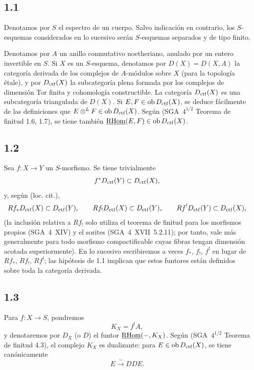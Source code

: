 \subsection*{1.1}
Denotamos por $S$ el espectro de un cuerpo. Salvo indicación en contrario, los $S$-esquemas considerados en lo sucesivo serán $S$-esquemas separados y de tipo finito.

Denotamos por $A$ un anillo conmutativo noetheriano, anulado por un entero invertible en $S$. Si $X$ es un $S$-esquema, denotamos por $D(X)=D(X,A)$ la categoría derivada de los complejos de $A$-módulos sobre $X$ (para la topología étale), y por $D_{\mathrm{ctf}}(X)$ la subcategoría plena formada por los complejos de dimensión Tor finita y cohomología constructible. La categoría $D_{\mathrm{ctf}}(X)$ es una subcategoría triangulada de $D(X)$. Si $E,F \in \operatorname{ob} D_{\mathrm{ctf}}(X)$, se deduce fácilmente de las definiciones que $E \otimes^{L} F \in \operatorname{ob} D_{\mathrm{ctf}}(X)$. Según (SGA~$4^{1/2}$ Teorema de finitud 1.6, 1.7), se tiene también $\underline{\mathrm{RHom}}(E,F) \in \operatorname{ob} D_{\mathrm{ctf}}(X)$.

\subsection*{1.2}
Sea $f:X\to Y$ un $S$-morfismo. Se tiene trivialmente
\[
f^{*}D_{\mathrm{ctf}}(Y) \subset D_{\mathrm{ctf}}(X),
\]
y, según (loc. cit.),
\[
Rf_{*}D_{\mathrm{ctf}}(X) \subset D_{\mathrm{ctf}}(Y),\qquad
Rf_{!}D_{\mathrm{ctf}}(X) \subset D_{\mathrm{ctf}}(Y),\qquad
Rf^{!}D_{\mathrm{ctf}}(Y) \subset D_{\mathrm{ctf}}(X),
\]
(la inclusión relativa a $Rf_{!}$ solo utiliza el teorema de finitud para los morfismos propios (SGA~4~XIV) y el sorites (SGA~4~XVII~5.2.11); por tanto, vale más generalmente para todo morfismo compactificable cuyas fibras tengan dimensión acotada superiormente). En lo sucesivo escribiremos a veces $f_{*}$, $f_{!}$, $f^{!}$ en lugar de $Rf_{*}$, $Rf_{!}$, $Rf^{!}$; las hipótesis de 1.1 implican que estos funtores están definidos sobre toda la categoría derivada.

\subsection*{1.3}
Para $f:X\to S$, pondremos
\[
K_X=f^{!}A,
\]
y denotaremos por $D_X$ (o $D$) el funtor $\underline{\mathrm{RHom}}(-,K_X)$. Según (SGA~$4^{1/2}$ Teorema de finitud 4.3), el complejo $K_X$ es dualizante: para $E\in\operatorname{ob} D_{\mathrm{ctf}}(X)$, se tiene canónicamente
\[
E \xrightarrow{\sim} DDE.
\]

